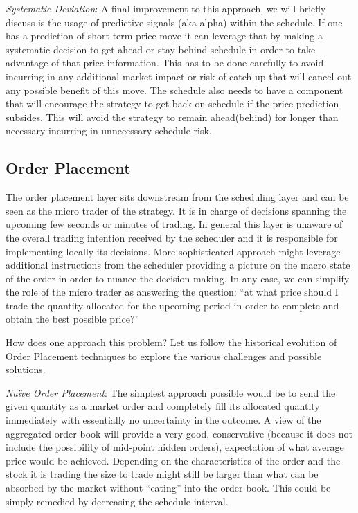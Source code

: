 \noindent\emph{Systematic Deviation}: A final improvement to this approach, we will briefly discuss is the usage of predictive signals (aka alpha) within the schedule. If one has a prediction of short term price move it can leverage that by making a systematic decision to get ahead or stay behind schedule in order to take advantage of that price information. This has to be done carefully to avoid incurring in any additional market impact or risk of catch-up that will cancel out any possible benefit of this move. The schedule also needs to have a component that will encourage the strategy to get back on schedule if the price prediction subsides. This will avoid the strategy to remain ahead(behind) for longer than necessary incurring in unnecessary schedule risk.



\subsection{Order Placement}

The order placement layer sits downstream from the scheduling layer and can be seen as the micro trader of the strategy. It is in charge of decisions spanning the upcoming few seconds or minutes of trading. In general this layer is unaware of the overall trading intention received by the scheduler and it is responsible for implementing locally its decisions. More sophisticated approach might leverage  additional instructions from the scheduler providing a picture on the macro state of the order in  order to nuance the decision making. In any case, we can simplify the role of the micro trader as answering the question: ``at what price should I trade the quantity allocated for the upcoming period in order to complete and obtain the best possible price?'' 


How does one approach this problem? Let us follow the historical evolution of Order Placement techniques to explore the various challenges and possible solutions. \twomedskip


\noindent\emph{Na\"ive Order Placement}: The simplest approach possible would be to send the given quantity as a market order and completely fill its allocated quantity immediately with essentially no uncertainty in the outcome. A view of the aggregated order-book will provide a very good, conservative (because it does not include the possibility of mid-point hidden orders), expectation of what average price would be achieved. Depending on the characteristics of the order and the stock it is trading the size to trade might still be larger than what can be absorbed by the market without ``eating'' into the order-book. This could be simply remedied by decreasing the schedule interval.



